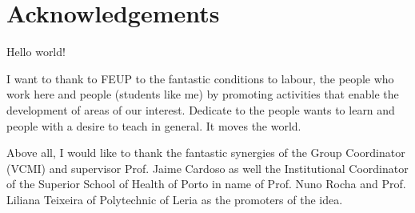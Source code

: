 \chapter*{Acknowledgements}

Hello world!

I want to thank to FEUP to the fantastic conditions to labour, the people who work here and people (students like me) by promoting activities that enable the development of areas of our interest.
Dedicate to the people wants to learn and people with a desire to teach in general. It moves the world.

Above all, I would like to thank the fantastic synergies of the Group Coordinator (VCMI) and supervisor Prof. Jaime Cardoso  as well the Institutional Coordinator of the Superior School of Health of Porto in name of Prof. Nuno Rocha and Prof. Liliana Teixeira of Polytechnic of Leria as the promoters of the idea. 

\vspace{10mm}
